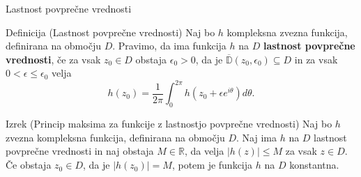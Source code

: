 \documentclass{beamer}
\theoremstyle{definition}
\theoremstyle{definition}
\begin{document}
\begin{frame}{Lastnost povprečne vrednosti}
    \begin{block}{Definicija (Lastnost povprečne vrednosti)}
        Naj bo $h$ kompleksna zvezna funkcija, definirana na območju $D$. Pravimo, da ima funkcija $h$ na $D$ \textbf{lastnost povprečne vrednosti}, če za vsak $z_0 \in D$ obstaja $\epsilon_0 > 0$, da je $\overline{\mathbb{D}}(z_0, \epsilon_0) \subseteq D$ in za vsak $0 < \epsilon \leq \epsilon_0 $ velja
        $$
            h(z_0) = \frac{1}{2 \pi} \int_{0}^{2 \pi}{h(z_0 + \epsilon e^{i \theta}) d\theta}.
        $$
    \end{block}
    \pause
     \begin{alertblock}{Izrek (Princip maksima za funkcije z lastnostjo povprečne vrednosti)}
        Naj bo $h$ zvezna kompleksna funkcija, definirana na območju $D$. Naj ima $h$ na $D$ lastnost povprečne vrednosti in naj obstaja $M \in \mathbb{R}$, da velja $|h(z)| \leq M$ za vsak $z \in D$. 
        Če obstaja $z_0 \in D$, da je $|h(z_0)| = M$, potem je funkcija $h$ na $D$ konstantna. 
    \end{alertblock}
 \end{frame}
\end{document}
